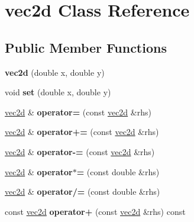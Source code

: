 \hypertarget{classvec2d}{
\section{vec2d Class Reference}
\label{classvec2d}
}
\subsection*{Public Member Functions}
\begin{DoxyCompactItemize}
\item 
\hypertarget{classvec2d_a710c4c5b51e8d16d963efcca23c4b129}{
{\bfseries vec2d} (double x, double y)}
\label{classvec2d_a710c4c5b51e8d16d963efcca23c4b129}

\item 
\hypertarget{classvec2d_a139948225408a3e72621226b3e8e0b11}{
void {\bfseries set} (double x, double y)}
\label{classvec2d_a139948225408a3e72621226b3e8e0b11}

\item 
\hypertarget{classvec2d_ab24c7d835e671c911d344950d501da7c}{
\hyperlink{classvec2d}{vec2d} \& {\bfseries operator=} (const \hyperlink{classvec2d}{vec2d} \&rhs)}
\label{classvec2d_ab24c7d835e671c911d344950d501da7c}

\item 
\hypertarget{classvec2d_ae0648952585457a1f6b5f0848db8829f}{
\hyperlink{classvec2d}{vec2d} \& {\bfseries operator+=} (const \hyperlink{classvec2d}{vec2d} \&rhs)}
\label{classvec2d_ae0648952585457a1f6b5f0848db8829f}

\item 
\hypertarget{classvec2d_ad4e4e6727ccd9913f6127d47232efae5}{
\hyperlink{classvec2d}{vec2d} \& {\bfseries operator-\/=} (const \hyperlink{classvec2d}{vec2d} \&rhs)}
\label{classvec2d_ad4e4e6727ccd9913f6127d47232efae5}

\item 
\hypertarget{classvec2d_a5c92dc187996f9e400343e2995cdc3f5}{
\hyperlink{classvec2d}{vec2d} \& {\bfseries operator$\ast$=} (const double \&rhs)}
\label{classvec2d_a5c92dc187996f9e400343e2995cdc3f5}

\item 
\hypertarget{classvec2d_adb49c2bc6579d14e3633c302ea9d44b3}{
\hyperlink{classvec2d}{vec2d} \& {\bfseries operator/=} (const double \&rhs)}
\label{classvec2d_adb49c2bc6579d14e3633c302ea9d44b3}

\item 
\hypertarget{classvec2d_a4fe110084dc48dfb44e4dc20d2946102}{
const \hyperlink{classvec2d}{vec2d} {\bfseries operator+} (const \hyperlink{classvec2d}{vec2d} \&rhs) const }
\label{classvec2d_a4fe110084dc48dfb44e4dc20d2946102}


\end{DoxyCompactItemize}
